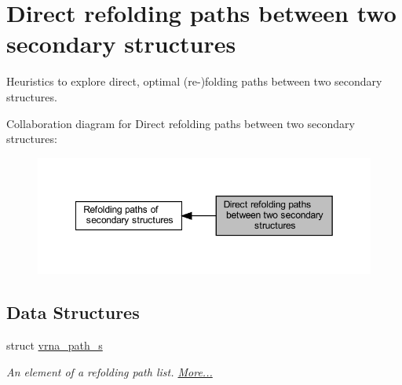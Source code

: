 \hypertarget{group__direct__paths}{}\section{Direct refolding paths between two secondary structures}
\label{group__direct__paths}


Heuristics to explore direct, optimal (re-\/)folding paths between two secondary structures.  


Collaboration diagram for Direct refolding paths between two secondary structures\+:
\nopagebreak
\begin{figure}[H]
\begin{center}
\leavevmode
\includegraphics[width=349pt]{group__direct__paths}
\end{center}
\end{figure}
\subsection*{Data Structures}
\begin{DoxyCompactItemize}
\item 
struct \hyperlink{group__direct__paths_structvrna__path__s}{vrna\+\_\+path\+\_\+s}
\begin{DoxyCompactList}\small\item\em An element of a refolding path list.  \hyperlink{group__direct__paths_structvrna__path__s}{More...}\end{DoxyCompactList}\end{DoxyCompactItemize}
